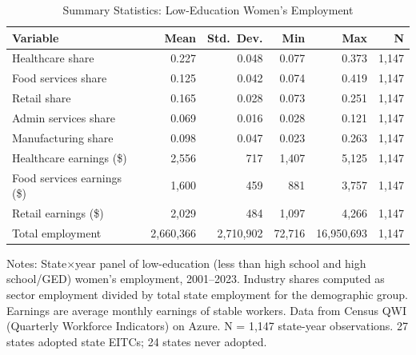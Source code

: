 \begin{table}[H]
\centering
\caption{Summary Statistics: Low-Education Women's Employment}
\label{tab:summary}
\begin{threeparttable}
\begin{tabular}{lrrrrr}
\toprule
Variable & Mean & Std.\ Dev. & Min & Max & N \\
\midrule
Healthcare share & 0.227 & 0.048 & 0.077 & 0.373 & 1,147 \\
Food services share & 0.125 & 0.042 & 0.074 & 0.419 & 1,147 \\
Retail share & 0.165 & 0.028 & 0.073 & 0.251 & 1,147 \\
Admin services share & 0.069 & 0.016 & 0.028 & 0.121 & 1,147 \\
Manufacturing share & 0.098 & 0.047 & 0.023 & 0.263 & 1,147 \\
Healthcare earnings (\$) & 2,556 & 717 & 1,407 & 5,125 & 1,147 \\
Food services earnings (\$) & 1,600 & 459 & 881 & 3,757 & 1,147 \\
Retail earnings (\$) & 2,029 & 484 & 1,097 & 4,266 & 1,147 \\
Total employment & 2,660,366 & 2,710,902 & 72,716 & 16,950,693 & 1,147 \\
\bottomrule
\end{tabular}
\begin{tablenotes}[flushleft]
\small
\item Notes: State$\times$year panel of low-education (less than high school and high school/GED) women's employment, 2001--2023. Industry shares computed as sector employment divided by total state employment for the demographic group. Earnings are average monthly earnings of stable workers. Data from Census QWI (Quarterly Workforce Indicators) on Azure. N = 1,147 state-year observations. 27 states adopted state EITCs; 24 states never adopted.
\end{tablenotes}
\end{threeparttable}
\end{table}
